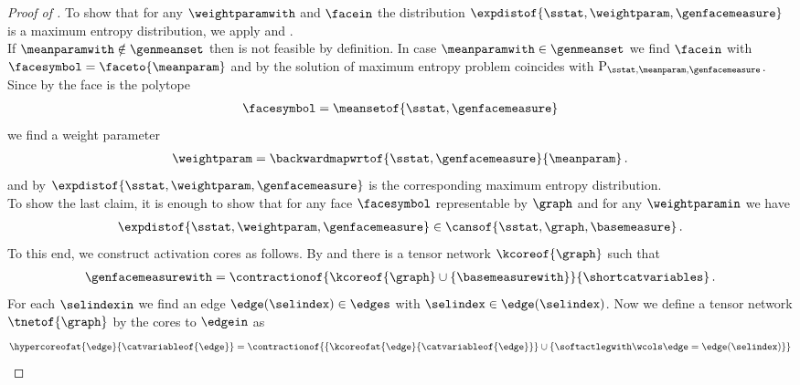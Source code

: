\begin{proof}[Proof of ]
    To show that for any $\weightparamwith$ and $\facein$ the distribution $\expdistof{\sstat,\weightparam,\genfacemeasure}$ is a maximum entropy distribution, we apply  and . \\
    If $\meanparamwith\notin\genmeanset$ then  is not feasible by definition.
    In case $\meanparamwith\in\genmeanset$ we find $\facein$ with $\facesymbol=\faceto{\meanparam}$ and by  the solution of maximum entropy problem  coincides with $\mathrm{P}_{\sstat,\meanparam,\genfacemeasure}$.
    Since by  the face is the polytope
    \begin{align*}
        \facesymbol
        =\meansetof{\sstat,\genfacemeasure}
    \end{align*}
    we find a weight parameter
    \begin{align*}
        \weightparam
        = \backwardmapwrtof{\sstat,\genfacemeasure}{\meanparam} \, .
    \end{align*}
    and by  $\expdistof{\sstat,\weightparam,\genfacemeasure}$ is the corresponding maximum entropy distribution. \\
    To show the last claim, it is enough to show that for any face $\facesymbol$ representable by $\graph$ and for any $\weightparamin$ we have
    \begin{align*}
        \expdistof{\sstat,\weightparam,\genfacemeasure}
        \in \cansof{\sstat,\graph,\basemeasure} \, .
    \end{align*}
    To this end, we construct activation cores as follows.
    By  and  there is a tensor network $\kcoreof{\graph}$ such that
    \begin{align*}
        \genfacemeasurewith
        = \contractionof{\kcoreof{\graph}\cup\{\basemeasurewith\}}{\shortcatvariables} \, .
    \end{align*}
    For each $\selindexin$ we find an edge $\edge(\selindex)\in\edges$ with $\selindex\in\edge(\selindex)$.
    Now we define a tensor network $\tnetof{\graph}$ by the cores to $\edgein$ as
    \begin{align*}
        \hypercoreofat{\edge}{\catvariableof{\edge}}
        = \contractionof{
            \{\kcoreofat{\edge}{\catvariableof{\edge}}\} \cup \{\softactlegwith\wcols\edge=\edge(\selindex)\}
}
\end{align*}
\end{proof}
